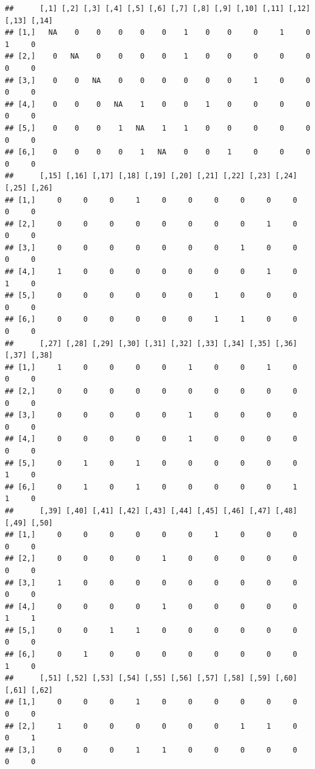 \documentclass[
]{book}
\theoremstyle{definition}
\theoremstyle{definition}
\theoremstyle{definition}
\theoremstyle{definition}
\theoremstyle{remark}
\begin{document}
\begin{verbatim}
##      [,1] [,2] [,3] [,4] [,5] [,6] [,7] [,8] [,9] [,10] [,11] [,12] [,13] [,14]
## [1,]   NA    0    0    0    0    0    1    0    0     0     1     0     1     0
## [2,]    0   NA    0    0    0    0    1    0    0     0     0     0     0     0
## [3,]    0    0   NA    0    0    0    0    0    0     1     0     0     0     0
## [4,]    0    0    0   NA    1    0    0    1    0     0     0     0     0     0
## [5,]    0    0    0    1   NA    1    1    0    0     0     0     0     0     0
## [6,]    0    0    0    0    1   NA    0    0    1     0     0     0     0     0
##      [,15] [,16] [,17] [,18] [,19] [,20] [,21] [,22] [,23] [,24] [,25] [,26]
## [1,]     0     0     0     1     0     0     0     0     0     0     0     0
## [2,]     0     0     0     0     0     0     0     0     1     0     0     0
## [3,]     0     0     0     0     0     0     0     1     0     0     0     0
## [4,]     1     0     0     0     0     0     0     0     1     0     1     0
## [5,]     0     0     0     0     0     0     1     0     0     0     0     0
## [6,]     0     0     0     0     0     0     1     1     0     0     0     0
##      [,27] [,28] [,29] [,30] [,31] [,32] [,33] [,34] [,35] [,36] [,37] [,38]
## [1,]     1     0     0     0     0     1     0     0     1     0     0     0
## [2,]     0     0     0     0     0     0     0     0     0     0     0     0
## [3,]     0     0     0     0     0     1     0     0     0     0     0     0
## [4,]     0     0     0     0     0     1     0     0     0     0     0     0
## [5,]     0     1     0     1     0     0     0     0     0     0     1     0
## [6,]     0     1     0     1     0     0     0     0     0     1     1     0
##      [,39] [,40] [,41] [,42] [,43] [,44] [,45] [,46] [,47] [,48] [,49] [,50]
## [1,]     0     0     0     0     0     0     1     0     0     0     0     0
## [2,]     0     0     0     0     1     0     0     0     0     0     0     0
## [3,]     1     0     0     0     0     0     0     0     0     0     0     0
## [4,]     0     0     0     0     1     0     0     0     0     0     1     1
## [5,]     0     0     1     1     0     0     0     0     0     0     0     0
## [6,]     0     1     0     0     0     0     0     0     0     0     1     0
##      [,51] [,52] [,53] [,54] [,55] [,56] [,57] [,58] [,59] [,60] [,61] [,62]
## [1,]     0     0     0     1     0     0     0     0     0     0     0     0
## [2,]     1     0     0     0     0     0     0     1     1     0     0     1
## [3,]     0     0     0     1     1     0     0     0     0     0     0     0

\end{verbatim}
\end{document}
